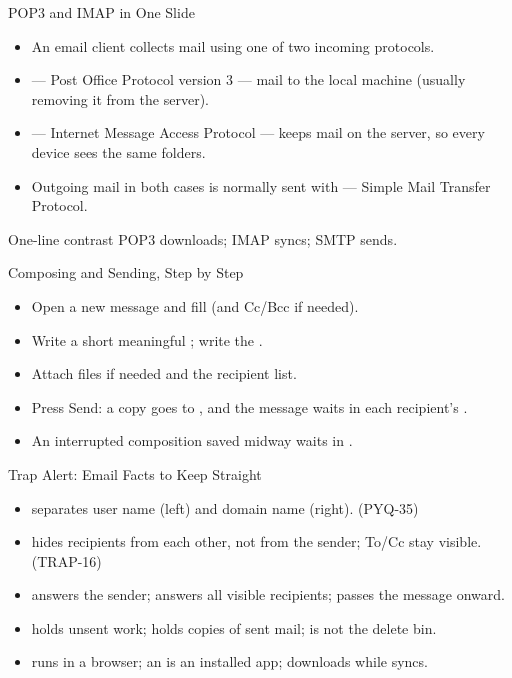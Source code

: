 \documentclass[aspectratio=169]{beamer}
\begin{document}
\begin{frame}{POP3 and IMAP in One Slide}
  \begin{itemize}
    \item An email client collects mail using one of two incoming protocols.
    \item {} --- Post Office Protocol version 3 --- 
      mail to the local machine (usually removing it from the server).
    \item {} --- Internet Message Access Protocol --- keeps mail
       on the server, so every device sees the same folders.
    \item Outgoing mail in both cases is normally sent with  ---
      Simple Mail Transfer Protocol.
  \end{itemize}
  \begin{block}{One-line contrast}
    POP3 downloads; IMAP syncs; SMTP sends.
  \end{block}
\end{frame}

\begin{frame}{Composing and Sending, Step by Step}
  \begin{itemize}
    \item Open a new message and fill  (and Cc/Bcc if needed).
    \item Write a short meaningful ; write the .
    \item Attach files if needed and  the recipient list.
    \item Press Send: a copy goes to , and the message waits in each
      recipient's .
    \item An interrupted composition saved midway waits in .
  \end{itemize}
\end{frame}

\begin{frame}{Trap Alert: Email Facts to Keep Straight}
  \begin{itemize}
    \item {} separates user name (left) and domain name (right). (PYQ-35)
    \item {} hides recipients from each other, not from the sender;
      To/Cc stay visible. (TRAP-16)
    \item {} answers the sender;  answers all visible
      recipients;  passes the message onward.
    \item {} holds unsent work;  holds copies of sent mail;
       is not the delete bin.
    \item {} runs in a browser; an  is an installed
      app;  downloads while  syncs.
  \end{itemize}
\end{frame}
\end{document}
